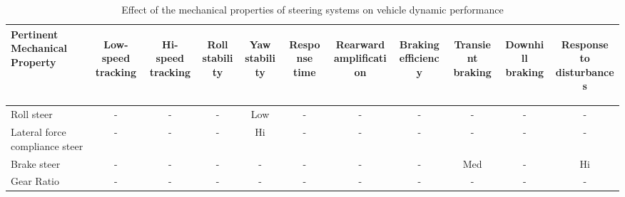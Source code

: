 \begin{table}[H]
	\centering\footnotesize
	\begin{threeparttable}
	
        \begin{tabulary}{\textwidth}{lcccccccccc}
            \toprule
            \textbf{Pertinent Mechanical Property} & \begin{sideways}\textbf{Low-speed tracking}\end{sideways} & \begin{sideways}\textbf{Hi-speed tracking}\end{sideways} & \begin{sideways}\textbf{Roll stability}\end{sideways} & \begin{sideways}\textbf{Yaw stability}\end{sideways} & \begin{sideways}\textbf{Response time}\end{sideways} & \begin{sideways}\textbf{Rearward amplification}\end{sideways} & \begin{sideways}\textbf{Braking efficiency}\end{sideways} & \begin{sideways}\textbf{Transient braking}\end{sideways} & \begin{sideways}\textbf{Downhill braking}\end{sideways} & \begin{sideways}\textbf{Response to disturbances}\end{sideways} \\\midrule
            Roll steer & -     & -     & -     & Low   & -     & -     & -     & -     & -     & - \\
            Lateral force compliance steer & -     & -     & -     & Hi    & -     & -     & -     & -     & -     & - \\
            Brake steer & -     & -     & -     & -     & -     & -     & -     & Med   & -     & Hi \\
            Gear Ratio & -     & -     & -     & -     & -     & -     & -     & -     & -     & -\\
            \bottomrule
		\end{tabulary}

		\caption{Effect of the mechanical properties of steering systems on vehicle dynamic performance}
		\label{table:effect-of-the-mechanical-properties-of-steering-systems-on-vehicle-dynamic-performance}

	\end{threeparttable}
\end{table}


